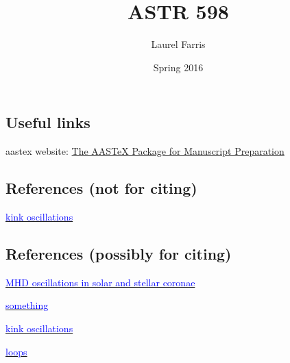 \documentclass[12pt]{article}
\title{ASTR 598}
\author{Laurel Farris}
\date{Spring 2016}
\begin{document}
\maketitle

\subsection*{Useful links}

aastex website: \textcolor{blue}
{\href{http://aas.org/aastex/aastex-package-manuscript-preparation}
{The AASTeX Package for Manuscript Preparation}}

\subsection*{References (not for citing)}

\href{http://home.physics.ucla.edu/calendar/conferences/cmpd/talks/cowley.pdf}
{\textcolor{blue}{kink oscillations}}

\subsection*{References (possibly for citing)}
\href{http://www2.warwick.ac.uk/fac/sci/physics/research/cfsa/people/valery/research/eprints/n07.pdf}
{\textcolor{blue}{MHD oscillations in solar and stellar coronae}}

\href{http://www.differencebetween.com/difference-between-oscillation-and-vs-wave/}
{\textcolor{blue}{something}}

\href{http://arxiv.org/pdf/1509.05519v1.pdf}
{\textcolor{blue}{kink oscillations}}

\href{http://legacy.jyi.org/volumes/volume9/issue2/articles/sheung.html}
{\textcolor{blue}{loops}}
\end{document}
